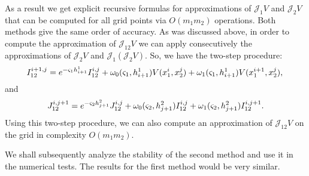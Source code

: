 As a result we get explicit recursive formulas for approximations of $\mathcal{J}_1 V$ and $\mathcal{J}_2 V$ that can be computed for all grid points via $O(m_1 m_2)$ operations. Both methods give the same order of accuracy. As was discussed above, in order to compute the approximation of $\mathcal{J}_{12} V$ we can apply consecutively the approximations of $\mathcal{J}_2 V$ and $\mathcal{J}_1 (\mathcal{J}_2 V)$. So, we have the two-step procedure:
\begin{equation}
	I_{12}^{i+1, j} = e^{-\varsigma_1 h^1_{i+1}} I_{12}^{i, j} + \omega_0(\varsigma_1, h^1_{i+1}) V(x_1^i, x_2^j) + \omega_1(\varsigma_1, h_{i+1}^1) V(x_1^{i+1}, x_2^{j}), \label{I_12_rec}\\
\end{equation}
and 
\begin{equation}
	J_{12}^{i, j+1} = e^{-\varsigma_2 h^2_{j+1}} J_{12}^{i, j} + \omega_0(\varsigma_2, h^2_{j+1}) I_{12}^{i, j} + \omega_1(\varsigma_2, h_{j+1}^2) I_{12}^{i, j+1}. \label{J_12_rec}\\
\end{equation}
Using this two-step procedure, we can also compute an approximation of $\mathcal{J}_{12} V$ on the grid in complexity $O(m_1 m_2)$.

 We shall subsequently analyze the stability of the second method and use it in the numerical tests. The results for the first method would be very similar.
 
